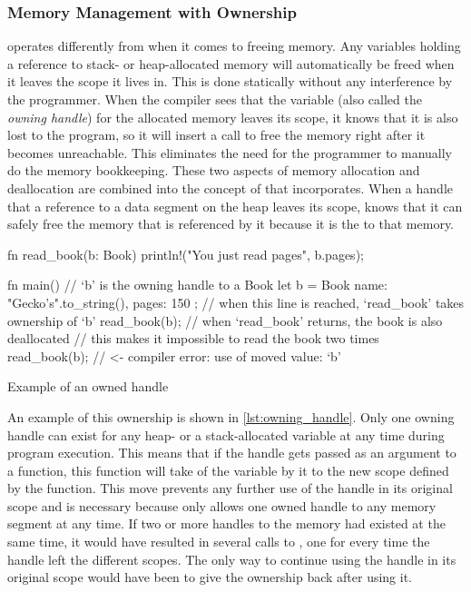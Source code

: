 \subsubsection{Memory Management with Ownership}

{\rust} operates differently from {\C} when it comes to freeing memory.
Any variables holding a reference to stack- or heap-allocated memory will automatically be freed when it leaves the scope it lives in.
This is done statically without any interference by the programmer.
When the compiler sees that the variable (also called the \emph{owning handle}) for the allocated memory leaves its scope, it knows that it is also lost to the program, so it will insert a call to free the memory right after it becomes unreachable.
This eliminates the need for the programmer to manually do the memory bookkeeping.
These two aspects of memory allocation and deallocation are combined into the concept of  that {\rust} incorporates.
When a handle that  a reference to a data segment on the heap leaves its scope, {\rust} knows that it can safely free the memory that is referenced by it because it is the  to that memory.

\begin{listing}[tb]
\begin{rustcode}
fn read_book(b: Book) {
  println!("You just read {} pages", b.pages);
}

fn main() {
  // `b' is the owning handle to a Book
  let b = Book { name: "Gecko's".to_string(), pages: 150 };
  // when this line is reached, `read_book' takes ownership of `b'
  read_book(b);
  // when `read_book' returns, the book is also deallocated
  // this makes it impossible to  read the book two times
  read_book(b); // <- compiler error: use of moved value: `b'
}
\end{rustcode}
\caption{Example of an owned handle}
\label{lst:owning_handle}
\end{listing}

An example of this ownership is shown in \autoref{lst:owning_handle}.
Only one owning handle can exist for any heap- or a stack-allocated variable at any time during program execution.
This means that if the handle gets passed as an argument to a function, this function will take  of the variable by  it to the new scope defined by the function.
This move prevents any further use of the handle in its original scope and is necessary because {\rust} only allows one owned handle to any memory segment at any time.
If two or more handles to the memory had existed at the same time, it would have resulted in several calls to , one for every time the handle left the different scopes.
The only way to continue using the handle in its original scope would have been to give the ownership back after using it.


